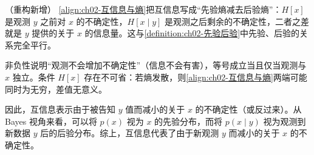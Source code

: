 \documentclass[../../main.tex]{subfiles}
\begin{document}
\begin{remark}（重构新增）
\eqref{align:ch02-互信息与熵}把互信息写成“先验熵减去后验熵”：$H[x]$ 是观测 $y$ 之前对 $x$ 的不确定性，$H[x\mid y]$ 是观测之后剩余的不确定性，二者之差就是 $y$ 提供的关于 $x$ 的信息量。这与\cref{definition:ch02-先验后验}中先验、后验的关系完全平行。

非负性说明“观测不会增加不确定性”（信息不会有害），等号成立当且仅当观测与 $x$ 独立。条件 $H[x]$ 存在不可省：若熵发散，则\eqref{align:ch02-互信息与熵}两端可能同时为无穷，差值无意义。
\end{remark}

因此，互信息表示由于被告知 $y$ 值而减小的关于 $x$ 的不确定性（或反过来）。从 Bayes 视角来看，可以将 $p(x)$ 视为 $x$ 的先验分布，而将 $p(x\mid y)$ 视为观测到新数据 $y$ 后的后验分布。综上，互信息代表了由于新观测 $y$ 而减小的关于 $x$ 的不确定性。
\end{document}
